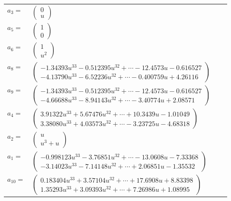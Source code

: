 \documentclass[1p]{elsarticle_modified}
\theoremstyle{definition}
\begin{document}
\begin{tabular}{m{7pt} m{180pt} m{7pt} m{180pt} }
\flushright $a_{3}=$&$\begin{pmatrix}0\\u\end{pmatrix}$ \\
\flushright $a_{5}=$&$\begin{pmatrix}1\\0\end{pmatrix}$ \\
\flushright $a_{6}=$&$\begin{pmatrix}1\\u^2\end{pmatrix}$ \\
\flushright $a_{8}=$&$\begin{pmatrix}-1.34393 u^{33}-0.512395 u^{32}+\cdots-12.4573 u-0.616527\\-4.13790 u^{33}-6.52236 u^{32}+\cdots-0.400759 u+4.26116\end{pmatrix}$ \\
\flushright $a_{9}=$&$\begin{pmatrix}-1.34393 u^{33}-0.512395 u^{32}+\cdots-12.4573 u-0.616527\\-4.66688 u^{33}-8.94143 u^{32}+\cdots-3.40774 u+2.08571\end{pmatrix}$ \\
\flushright $a_{4}=$&$\begin{pmatrix}3.91322 u^{33}+5.67476 u^{32}+\cdots+10.3439 u-1.01049\\3.38080 u^{33}+4.03573 u^{32}+\cdots-3.23725 u-4.68318\end{pmatrix}$ \\
\flushright $a_{2}=$&$\begin{pmatrix}u\\u^3+u\end{pmatrix}$ \\
\flushright $a_{1}=$&$\begin{pmatrix}-0.998123 u^{33}-3.76851 u^{32}+\cdots-13.0608 u-7.33368\\-3.14023 u^{33}-7.14148 u^{32}+\cdots+2.06851 u-1.35532\end{pmatrix}$ \\
\flushright $a_{10}=$&$\begin{pmatrix}0.183404 u^{33}+3.57104 u^{32}+\cdots+17.6908 u+8.83398\\1.35293 u^{33}+3.09393 u^{32}+\cdots+7.26986 u+1.08995\end{pmatrix}$ \\

\end{tabular}
\end{document}

